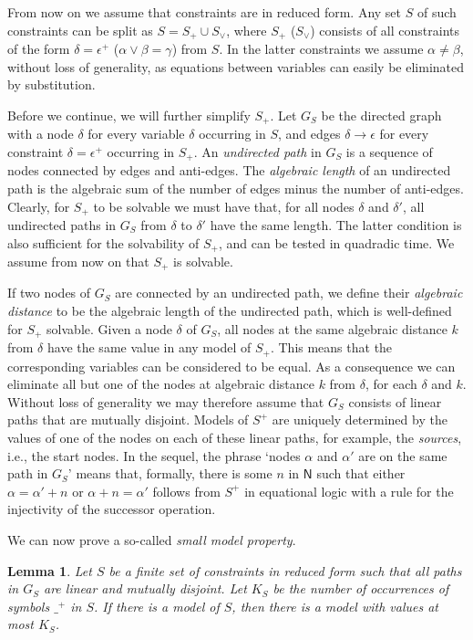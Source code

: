 \documentclass[11pt,a4paper]{article}
\newtheorem{lemma}{Lemma}[theorem]
\def\NN{\mathsf{N}}
\begin{document}
From now on we assume that constraints are in reduced form.
Any set $S$ of such constraints can be split as $S=S_+ \cup S_\vee$,
where $S_+$ ($S_\vee$) consists of all constraints of the form  
$\delta = \epsilon^+$ ($\alpha\vee\beta = \gamma$) from $S$.
In the latter constraints we assume $\alpha\neq\beta$,
without loss of generality, as equations between variables
can easily be eliminated by substitution.

Before we continue, we will further simplify $S_+$.
Let $G_S$ be the directed graph with a node $\delta$ for every
variable $\delta$ occurring in $S$, and edges $\delta\to\epsilon$
for every constraint $\delta = \epsilon^+$ occurring in $S_+$.
An \emph{undirected path} in $G_S$ is a sequence of nodes connected
by edges and anti-edges.
The \emph{algebraic length} of an undirected path is the algebraic sum 
of the number of edges minus the number of anti-edges.
Clearly, for $S_+$ to be solvable we must have that,
for all nodes $\delta$ and $\delta'$,
all undirected paths in $G_S$ from $\delta$ to $\delta'$ have the same length.
The latter condition is also sufficient for the solvability of $S_+$,
and can be tested in quadradic time. 
We assume from now on that $S_+$ is solvable.

If two nodes of $G_S$ are connected by an undirected path,
we define their \emph{algebraic distance} to be the algebraic length of
the undirected path, which is well-defined for $S_+$ solvable. 
Given a node $\delta$ of $G_S$, all nodes at the same algebraic distance $k$ from 
$\delta$ have the same value in any model of $S_+$. 
This means that the corresponding variables can be considered to be equal.
As a consequence we can eliminate all but one of the nodes at 
algebraic distance $k$ from $\delta$, for each $\delta$ and $k$.
Without loss of generality we may therefore assume that $G_S$ consists 
of linear paths that are mutually disjoint.
Models of $S^+$ are uniquely determined by the values of 
one of the nodes on each of these linear paths, for example,
the \emph{sources}, i.e., the start nodes. In the sequel,
the phrase `nodes $\alpha$ and $\alpha'$ are on the same path in $G_S$'
means that, formally, there is some $n$ in $\NN$ such that
either $\alpha=\alpha'+n$ or $\alpha+n=\alpha'$ follows from $S^+$
in equational logic with a rule for the injectivity of the successor operation.

We can now prove a so-called \emph{small model property}.
\begin{lemma}\label{lem:small-model}
Let  $S$ be a finite set of constraints in reduced form such that all paths in $G_S$ are linear
and mutually disjoint. Let $K_{S}$ be the number of occurrences of symbols $\_^+$ in $S$.
If there is a model of $S$, then there is a model with values at most $K_{S}$.
\end{lemma}
\end{document}

